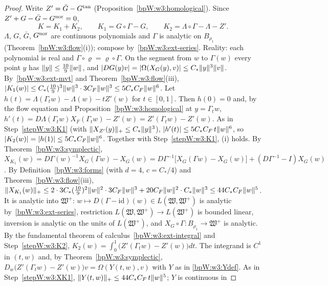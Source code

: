 \begin{proof}
Write $Z'=\bar G-G^{\rm tan}$ (Proposition~\ref{bpW:w3:homological}). Since $Z'+G-\bar G-G^{\rm nor}=0$,
\[K=K_1+K_2,\qquad K_1=G\circ\Gamma-G,\qquad K_2=\Lambda\circ\Gamma-\Lambda-Z'.\]
\label{stepW:w3:Kanalytic}
$\Lambda$, $G$, $\bar G$, $G^{\rm nor}$ are continuous polynomials and $\Gamma$ is analytic on $B_{\rho_1}$
(Theorem~\ref{bpW:w3:flow}(i)); compose by~\ref{bpW:w3:ext-series}. Reality: each polynomial is real and
$\Gamma\circ\varrho=\varrho\circ\Gamma$.
\label{stepW:w3:K1}
On the segment from $w$ to $\Gamma(w)$ every point $y$ has $\lVert y\rVert\le\frac{10}9\lVert w\rVert$, and
$\lvert DG(y)v\rvert=\lvert \Omega(X_G(y),v)\rvert\le C_*\lVert y\rVert^3\lVert v\rVert$. By~\ref{bpW:w3:ext-mvt} and
Theorem~\ref{bpW:w3:flow}(iii), $\lvert K_1(w)\rvert\le C_*(\frac{10}9)^3\lVert w\rVert^3\cdot3C_F\lVert w\rVert^3\le5C_*C_F\lVert w\rVert^6$.
\label{stepW:w3:K2}
Let $h(t)=\Lambda(\Gamma_tw)-\Lambda(w)-tZ'(w)$ for $t\in[0,1]$. Then $h(0)=0$ and, by the flow equation and
Proposition~\ref{bpW:w3:homological} at $y=\Gamma_tw$,
$h'(t)=D\Lambda(\Gamma_tw)X_F(\Gamma_tw)-Z'(w)=Z'(\Gamma_tw)-Z'(w)$. As in Step~\ref{stepW:w3:K1} (with
$\lVert X_{Z'}(y)\rVert_+\le C_*\lVert y\rVert^3$), $\lvert h'(t)\rvert\le5C_*C_F\,t\lVert w\rVert^6$, so
$\lvert K_2(w)\rvert=\lvert h(1)\rvert\le5C_*C_F\lVert w\rVert^6$. Together with Step~\ref{stepW:w3:K1}, (i) holds.
\label{stepW:w3:XK1}
By Theorem~\ref{bpW:w3:symplectic}, $X_{K_1}(w)=D\Gamma(w)^{-1}X_G(\Gamma w)-X_G(w)
=D\Gamma^{-1}\bigl[X_G(\Gamma w)-X_G(w)\bigr]+(D\Gamma^{-1}-I)X_G(w)$. By Definition~\ref{bpW:w3:forms} (with
$d=4$, $c=C_*/4$) and Theorem~\ref{bpW:w3:flow}(iii),
$\lVert X_{K_1}(w)\rVert_+\le2\cdot3C_*(\tfrac{10}9)^2\lVert w\rVert^2\cdot3C_F\lVert w\rVert^3+20C_F\lVert w\rVert^2\cdot C_*\lVert w\rVert^3\le44C_*C_F\lVert w\rVert^5$.
It is analytic into $\mathfrak W^+$: $w\mapsto D(\Gamma-\mathrm{id})(w)\in L(\mathfrak W,\mathfrak W^+)$ is analytic
by~\ref{bpW:w3:ext-series}, restriction $L(\mathfrak W,\mathfrak W^+)\to L(\mathfrak W^+)$ is bounded linear, inversion
is analytic on the units of $L(\mathfrak W^+)$, and $X_G\circ\Gamma:B_{\rho_1}\to\mathfrak W^+$ is analytic.
\label{stepW:w3:XK2}
By the fundamental theorem of calculus~\ref{bpW:w3:ext-integral} and Step~\ref{stepW:w3:K2},
$K_2(w)=\int_0^1\bigl(Z'(\Gamma_tw)-Z'(w)\bigr)dt$. The integrand is $C^1$ in $(t,w)$ and, by
Theorem~\ref{bpW:w3:symplectic}, $D_w\bigl(Z'(\Gamma_tw)-Z'(w)\bigr)v=\Omega(Y(t,w),v)$ with $Y$ as in
\eqref{bpW:w3:Ydef}. As in Step~\ref{stepW:w3:XK1}, $\lVert Y(t,w)\rVert_+\le44C_*C_F\,t\lVert w\rVert^5$; $Y$ is continuous in

\end{proof}
